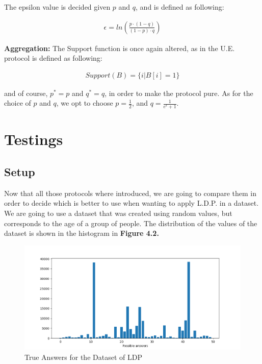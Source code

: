 The epsilon value is decided given $p$ and $q$, and is defined as following:

\begin{align*}
    \epsilon = ln(\frac{p\cdot(1-q)}{(1-p)\cdot q})
\end{align*}

\textbf{Aggregation:} The Support function is once again altered, as in the U.E. protocol is defined as following:

\begin{align*}
    Support(B) = \{i | B[i] = 1\}
\end{align*}

and of course, $p^* = p$ and $q^* = q$, in order to make the protocol pure. As for the choice of $p$ and $q$, we opt to choose $p = \frac{1}{2}$, and $q = \frac{1}{e^\epsilon + 1}$.

\section{Testings}

\subsection{Setup}

Now that all those protocols where introduced, we are going to compare them in order to decide which is better to use when wanting to apply L.D.P. in a dataset. We are going to use a dataset that was created using random values, but corresponds to the age of a group of people. The distribution of the values of the dataset is shown in the histogram in \textbf{Figure 4.2. }

\begin{figure}[!htb]\centering
    \includegraphics[width=1\textwidth]{images/true_answers_ldp.png}
    \caption{True Answers for the Dataset of LDP}
\end{figure}

